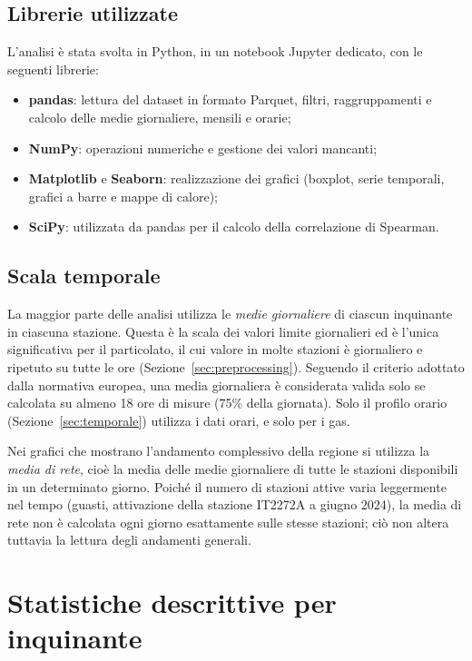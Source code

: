 \documentclass[11pt]{report}
\begin{document}
\subsection{Librerie utilizzate}
L'analisi è stata svolta in Python, in un notebook Jupyter dedicato, con le
seguenti librerie:
\begin{itemize}
  \item \textbf{pandas}: lettura del dataset in formato Parquet, filtri,
        raggruppamenti e calcolo delle medie giornaliere, mensili e orarie;
  \item \textbf{NumPy}: operazioni numeriche e gestione dei valori mancanti;
  \item \textbf{Matplotlib} e \textbf{Seaborn}: realizzazione dei grafici
        (boxplot, serie temporali, grafici a barre e mappe di calore);
  \item \textbf{SciPy}: utilizzata da pandas per il calcolo della correlazione
        di Spearman.
\end{itemize}

\subsection{Scala temporale}
La maggior parte delle analisi utilizza le \emph{medie giornaliere} di ciascun
inquinante in ciascuna stazione. Questa è la scala dei valori limite giornalieri ed
è l'unica significativa per il particolato, il cui valore in molte stazioni è
giornaliero e ripetuto su tutte le ore (Sezione~\ref{sec:preprocessing}). Seguendo
il criterio adottato dalla normativa europea, una media giornaliera è considerata
valida solo se calcolata su almeno 18 ore di misure (75\% della giornata). Solo il
profilo orario (Sezione~\ref{sec:temporale}) utilizza i dati orari, e solo per i gas.

Nei grafici che mostrano l'andamento complessivo della regione si utilizza la
\emph{media di rete}, cioè la media delle medie giornaliere di tutte le stazioni
disponibili in un determinato giorno. Poiché il numero di stazioni attive varia
leggermente nel tempo (guasti, attivazione della stazione IT2272A a giugno 2024),
la media di rete non è calcolata ogni giorno esattamente sulle stesse stazioni; ciò
non altera tuttavia la lettura degli andamenti generali.

\section{Statistiche descrittive per inquinante}
\label{sec:statistiche}
\end{document}
